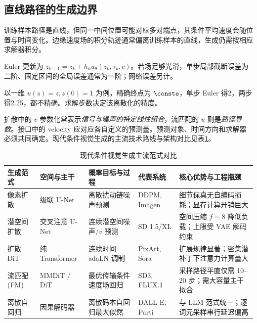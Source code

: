 \documentclass[../textbook.tex]{subfiles}
\begin{document}
\subsection{直线路径的生成边界}
\optional

\begin{remark}[样本路径与生成轨迹]
训练样本路径是直线，但同一中间位置可能对应多对端点，其条件平均速度会随位置与时间变化。边缘速度场的积分轨迹通常偏离训练样本的直线，生成仍需按相应求解器积分。
\end{remark}

Euler 更新为 $z_{k+1}=z_k+h_k u_\theta(z_k,\tau_k,c)$。若场足够光滑，单步局部截断误差为二阶、固定区间的全局误差通常为一阶；网络误差另计。
\begin{example}
以一维 $u(z)=z,z(0)=1$ 为例，精确终点为 $\conste$，单步 Euler 得2，两步得2.25，都不精确。求解步数决定该离散化的精度。
\end{example}

扩散中的 $v$ 参数化常表示\emph{信号与噪声的特定线性组合}，流匹配的 $u$ 则是\emph{路径导数}。接口中的 velocity 应对应各自定义的预测量。预测对象、时间方向和求解器必须共同确定。现代条件视觉生成的主流技术路线与架构对比见表\ref{tab:vision-generation-taxonomy}。

\begin{table}[htbp]
\centering
\small
\setlength{\tabcolsep}{3pt}
\caption{现代条件视觉生成主流范式对比}\label{tab:vision-generation-taxonomy}
\begin{tabularx}{\linewidth}{@{}p{1.8cm}p{2.0cm}p{2.6cm}p{1.8cm}X@{}}
\toprule
生成范式 & 空间与主干 & 概率目标与过程 & 代表系统 & 核心优势与工程瓶颈 \\
\midrule
像素扩散 & 级联 U-Net & 离散扰动链噪声预测 & DDPM, Imagen & 细节保真无自编码损耗；显存计算开销巨大 \\
潜空间扩散 & 交叉注意 U-Net & 连续潜空间噪声/$v$ 预测 & SD 1.5/XL & 空间压缩 $f=8$ 降低负载；上限受 VAE 解码约束 \\
扩散 DiT & 纯 Transformer & 连续时间 adaLN 调制 & PixArt, Sora & 扩展规律显著；密集潜补丁下注意力计算量大 \\
流匹配 (FM) & MMDiT / DiT & 最优传输条件速度场回归 & SD3, FLUX.1 & 采样路径平直仅需 10--20 步；需大容量主干拟合 \\
离散自回归 & 因果解码器 & 离散码本自回归最大似然 & DALL-E, Parti & 与 LLM 范式统一；逐词元采样串行延迟偏高 \\
\bottomrule
\end{tabularx}
\end{table}
\end{document}

